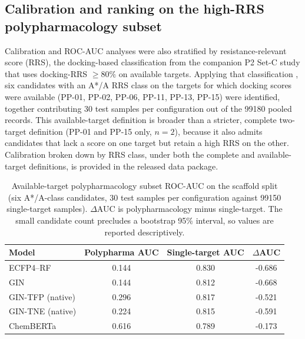 \documentclass[11pt,a4paper]{article}
\begin{document}
\subsection{Calibration and ranking on the high-RRS polypharmacology subset}
\label{sec:polypharma_si}

Calibration and ROC-AUC analyses were also stratified by resistance-relevant score (RRS), the docking-based classification from the companion P2 Set-C study that uses docking-RRS $\ge 80\%$ on available targets. Applying that classification \citep{temgoua2027md}, six candidates with an A*/A RRS class on the targets for which docking scores were available (PP-01, PP-02, PP-06, PP-11, PP-13, PP-15) were identified, together contributing \num{30} test samples per configuration out of the \num{99180} pooled records. This available-target definition is broader than a stricter, complete two-target definition (PP-01 and PP-15 only, $n=2$), because it also admits candidates that lack a score on one target but retain a high RRS on the other. Calibration broken down by RRS class, under both the complete and available-target definitions, is provided in the released data package.

\begin{table}[h]
\centering
\caption{Available-target polypharmacology subset ROC-AUC on the scaffold split (six A*/A-class candidates, \num{30} test samples per configuration against \num{99150} single-target samples). $\Delta$AUC is polypharmacology minus single-target. The small candidate count precludes a bootstrap 95\% interval, so values are reported descriptively.}
\label{tab:s2_polypharma_available}
\small
\begin{tabular}{l S[table-format=1.3] S[table-format=1.3] S[table-format=-1.3]}
\toprule
Model & {Polypharma AUC} & {Single-target AUC} & {$\Delta$AUC} \\
\midrule
ECFP4--RF & \num{0.144} & \num{0.830} & -0.686 \\
GIN & 0.144 & 0.812 & -0.668 \\
GIN-TFP (native) & 0.296 & 0.817 & -0.521 \\
GIN-TNE (native) & 0.224 & 0.815 & -0.591 \\
ChemBERTa & 0.616 & 0.789 & -0.173 \\
\bottomrule
\end{tabular}
\end{table}
\end{document}
